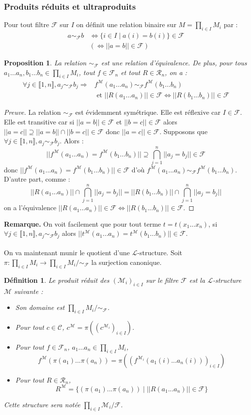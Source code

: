\documentclass[11pt,a4paper]{article}
\newtheorem{defi}[theo]{Définition}
\newtheorem{prop}[theo]{Proposition}
\newcommand{\La}{\mathcal{L}}
\newcommand{\M}{\mathcal{M}}
\newcommand{\itemz}{\item[$\triangleright$]}
\newcommand{\F}{\mathcal{F}}
\newcommand{\gr}{\textbf}
\newcommand{\preuve}{\begin{proof}[Preuve]}
\newcommand{\cqfd}{\end{proof}}
\newcommand{\equi}{\Leftrightarrow}
\newcommand{\R}{\mathcal{R}}
\newcommand{\C}{\mathcal{C}}
\newcommand{\1}{\mathbbm{1}}
\begin{document}
\subsubsection{Produits réduits et ultraproduits}
Pour tout filtre $\F$ sur $I$ on définit une relation binaire sur $M = \prod_{i\in I} M_i$ par :
\begin{align*}
a \sim_\F b & \equi \{ i \in I \mid a(i) = b(i) \} \in \F \\
& (\equi || a = b || \in \F) \end{align*}
\begin{prop}
La relation $\sim_\F$ est une relation d'équivalence. De plus, pour tous $a_1...a_n,b_1...b_n \in \prod_{i\in I} M_i$, tout $f \in \F_n$ et tout $R \in \R_n$, on a :
\begin{align*}
\forall j \in \llbracket 1,n \rrbracket, a_j \sim_\F b_j \Rightarrow & f^\M (a_1...a_n) \sim_\F f^\M (b_1...b_n) \\ & \text{ et } ||R(a_1...a_n)|| \in \F \equi ||R(b_1...b_n)||\in \F
\end{align*}
\end{prop}
\preuve
La relation $\sim_\F$ est évidemment symétrique. Elle est réflexive car $I \in \F$. Elle est transitive car si $|| a = b || \in \F$ et $|| b = c || \in \F$ alors $ || a = c || \supseteq || a = b || \cap || b = c || \in \F$ donc $|| a = c || \in \F$. Supposons que $\forall j \in \llbracket 1,n \rrbracket, a_j \sim_\F b_j$. Alors :
\[ || f^\M(a_1...a_n) = f^\M(b_1...b_n) || \supseteq \bigcap_{j=1}^n || a_j = b_j || \in \F \]
donc $|| f^\M(a_1...a_n) = f^\M(b_1...b_n) || \in \F$ d'où $f^\M(a_1...a_n) \sim_\F f^\M(b_1...b_n)$. D'autre part, comme :
\[ || R(a_1...a_n) || \cap \bigcap_{j=1}^n || a_j = b_j || = || R(b_1...b_n) || \cap \bigcap_{j=1}^n || a_j = b_j || \]
on a l'équivalence $ || R(a_1...a_n) || \in \F \equi || R(b_1...b_n) || \in \F$.
\cqfd
\gr{Remarque.} On voit facilement que pour tout terme $t = t(x_1...x_n)$, si $\forall j \in \llbracket 1,n \rrbracket, a_j \sim_\F b_j$ alors $|| t^\M (a_1...a_n) = t^\M (b_1...b_n) || \in \F$.\\\\
On va maintenant munir le quotient d'une $\La$-structure. Soit $\pi : \prod_{i\in I} M_i \to \prod_{i\in I} M_i / \sim_\F$ la surjection canonique.
\begin{defi}
Le produit réduit des $(\M_i)_{i\in I}$ sur le filtre $\F$ est la $\La$-structure $\M$ suivante :
\begin{itemize}
\setlength\itemsep{-0.3em}
\itemz Son domaine est $\prod_{i\in I} M_i / \sim_\F$.
\itemz Pour tout $c \in \C$, $c^\M = \pi((c^{\M_i})_{i\in I})$.
\itemz Pour tout $f \in \F_n$, $a_1...a_n \in \prod_{i\in I} M_i$,
\[ f^\M(\pi(a_1)...\pi(a_n)) = \pi((f^{\M_i}(a_1(i)...a_n(i)))_{i\in I}) \]
\itemz Pour tout $R \in \R_n$,
\[ R^\M = \{ (\pi(a_1)...\pi(a_n)) \mid || R(a_1...a_n) || \in \F \} \]
\end{itemize}
Cette structure sera notée $\prod_{i\in I} \M_i / \F$.
\end{defi}
\end{document}
